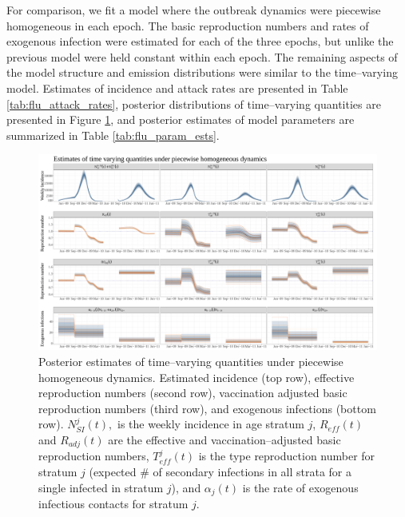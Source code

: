For comparison, we fit a model where the outbreak dynamics were piecewise homogeneous in each epoch. The basic reproduction numbers and rates of exogenous infection were estimated for each of the three epochs, but unlike the previous model were held constant within each epoch. The remaining aspects of the model structure and emission distributions were similar to the time--varying model. Estimates of incidence and attack rates are presented in Table \ref{tab:flu_attack_rates}, posterior distributions of time--varying quantities are presented in Figure \ref{fig:fluconstodetimevaryingplots}, and posterior estimates of model parameters are summarized in Table \ref{tab:flu_param_ests}. 

\begin{figure}
	\centering
	\includegraphics[width=0.95\linewidth]{figures/flu_const_ode_timevarying_plots}
	\caption[Estimated A(H1N1) incidence, reproduction numbers, and rates of exogenous infection under piecewise homogeneous dynamics.]{Posterior estimates of time--varying quantities under piecewise homogeneous dynamics. Estimated incidence (top row), effective reproduction numbers (second row), vaccination adjusted basic reproduction numbers (third row), and exogenous infections (bottom row). $ N_{SI}^j(t), $ is the weekly incidence in age stratum $ j $, $ R_{eff}(t) $ and $ R_{adj}(t) $ are the effective and vaccination--adjusted basic reproduction numbers, $ T_{eff}^j(t) $ is the type reproduction number for stratum $ j $ (expected \# of secondary infections in all strata for a single infected in stratum $ j $), and $ \alpha_j(t) $ is the rate of exogenous infectious contacts for stratum $ j $.}
	\label{fig:fluconstodetimevaryingplots}
\end{figure}

